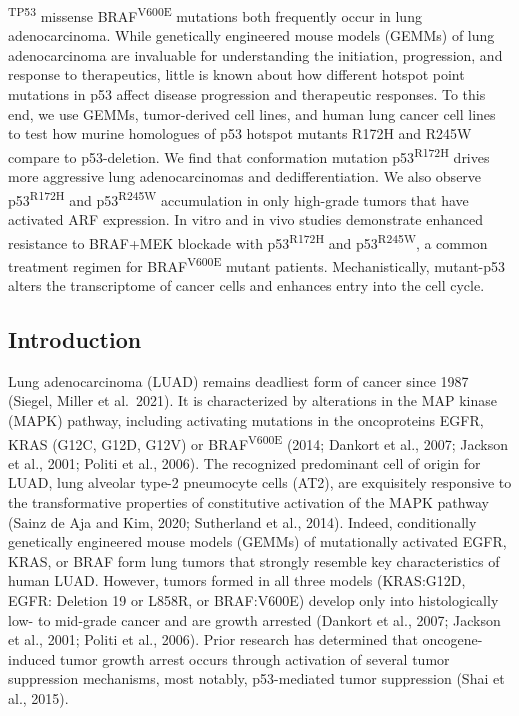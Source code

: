 \textsuperscript{TP53} missense BRAF\textsuperscript{V600E} mutations both frequently occur in lung adenocarcinoma. While genetically engineered mouse models (GEMMs) of lung adenocarcinoma are invaluable for understanding the initiation, progression, and response to therapeutics, little is known about how different hotspot point mutations in p53 affect disease progression and therapeutic responses. To this end, we use GEMMs, tumor-derived cell lines, and human lung cancer cell lines to test how murine homologues of p53 hotspot mutants R172H and R245W compare to p53-deletion. We find that conformation mutation p53\textsuperscript{R172H} drives more aggressive lung adenocarcinomas and dedifferentiation. We also observe p53\textsuperscript{R172H} and p53\textsuperscript{R245W} accumulation in only high-grade tumors that have activated ARF expression. In vitro and in vivo studies demonstrate enhanced resistance to BRAF+MEK blockade with p53\textsuperscript{R172H} and p53\textsuperscript{R245W}, a common treatment regimen for BRAF\textsuperscript{V600E} mutant patients. Mechanistically, mutant-p53 alters the transcriptome of cancer cells and enhances entry into the cell cycle.

\hypertarget{introduction-1}{%
\subsection{Introduction}\label{introduction-1}}

Lung adenocarcinoma (LUAD) remains deadliest form of cancer since 1987 (Siegel, Miller et al.~2021). It is characterized by alterations in the MAP kinase (MAPK) pathway, including activating mutations in the oncoproteins EGFR, KRAS (G12C, G12D, G12V) or BRAF\textsuperscript{V600E} (2014; Dankort et al., 2007; Jackson et al., 2001; Politi et al., 2006). The recognized predominant cell of origin for LUAD, lung alveolar type-2 pneumocyte cells (AT2), are exquisitely responsive to the transformative properties of constitutive activation of the MAPK pathway (Sainz de Aja and Kim, 2020; Sutherland et al., 2014). Indeed, conditionally genetically engineered mouse models (GEMMs) of mutationally activated EGFR, KRAS, or BRAF form lung tumors that strongly resemble key characteristics of human LUAD. However, tumors formed in all three models (KRAS:G12D, EGFR: Deletion 19 or L858R, or BRAF:V600E) develop only into histologically low- to mid-grade cancer and are growth arrested (Dankort et al., 2007; Jackson et al., 2001; Politi et al., 2006). Prior research has determined that oncogene-induced tumor growth arrest occurs through activation of several tumor suppression mechanisms, most notably, p53-mediated tumor suppression (Shai et al., 2015).

